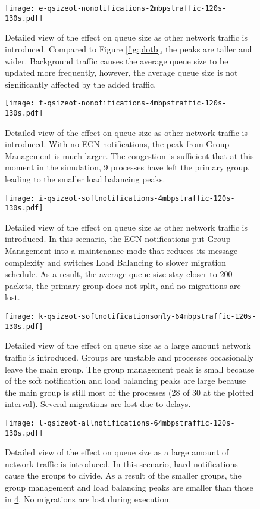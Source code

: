 \begin{figure}
\centering
\texttt{[image: e-qsizeot-nonotifications-2mbpstraffic-120s-130s.pdf]}
\caption{Detailed view of the effect on queue size as other network traffic is introduced. Compared to Figure \ref{fig:plotb}, the peaks are taller and wider. Background traffic causes the average queue size to be updated more frequently, however, the average queue size is not significantly affected by the added traffic.}
\label{fig:plote}
\end{figure}

\begin{figure}
\centering
\texttt{[image: f-qsizeot-nonotifications-4mbpstraffic-120s-130s.pdf]}
\caption{Detailed view of the effect on queue size as other network traffic is introduced. With no \ac{ECN} notifications, the peak from Group Management is much larger. The congestion is sufficient that at this moment in the simulation, 9 processes have left the primary group, leading to the smaller load balancing peaks.}
\label{fig:plotf}
\end{figure}

\begin{figure}
\centering
\texttt{[image: i-qsizeot-softnotifications-4mbpstraffic-120s-130s.pdf]}
\caption{Detailed view of the effect on queue size as other network traffic is introduced. In this scenario, the ECN notifications put Group Management into a maintenance mode that reduces its message complexity and switches Load Balancing to slower migration schedule. As a result, the average queue size stay closer to 200 packets, the primary group does not split, and no migrations are lost.}
\label{fig:ploti}
\end{figure}

\begin{figure}
\centering
\texttt{[image: k-qsizeot-softnotificationsonly-64mbpstraffic-120s-130s.pdf]}
\caption{Detailed view of the effect on queue size as a large amount network traffic is introduced. Groups are unstable and processes occasionally leave the main group. The group management peak is small because of the soft notification and load balancing peaks are large because the main group is still most of the processes (28 of 30 at the plotted interval). Several migrations are lost due to delays.}
\label{fig:plotk}
\end{figure}

\begin{figure}
\centering
\texttt{[image: l-qsizeot-allnotifications-64mbpstraffic-120s-130s.pdf]}
\caption{Detailed view of the effect on queue size as a large amount of network traffic is introduced. In this scenario, hard notifications cause the groups to divide. As a result of the smaller groups, the group management and load balancing peaks are smaller than those in \ref{fig:plotk}. No migrations are lost during execution.}
\label{fig:plotl}
\end{figure}


